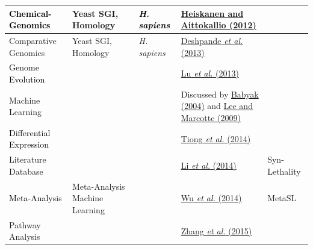\begin{flushleft}
\begin{supertabular}{m{4.421cm}|m{2.342cm}|m{2.388cm}|m{4.552cm}|m{2.299cm}}
\color{black} \textcolor{black}{Chemical-Genomics} &
\color{black} Yeast SGI,
Homology &
\color{black}
\textit{\textcolor{black}{H. sapiens}} &
\color{black}
\hyperlink{ENREF48}{Heiskanen and Aittokallio (2012)} &
~
\\\hline
Comparative Genomics &
Yeast SGI, Homology &
\textit{H. sapiens} &
\hyperlink{ENREF30}{Deshpande}\hyperlink{ENREF30}{\textit{ et
al.}}\hyperlink{ENREF30}{ (2013)} &
~
\\\hline
{}\color{black}
\textcolor{black}{Genome Evolution} &
~
 &
~
 &
\color{black}
\hyperlink{ENREF73}{Lu}\hyperlink{ENREF73}{\textit{\textcolor{black}{
et al.}}}\hyperlink{ENREF73}{ (2013)} &
~
\\\hline
Machine Learning &
~
 &
~
 &
Discussed by \hyperlink{ENREF6}{Babyak (2004)} and
\hyperlink{ENREF64}{Lee and Marcotte (2009)} &
~
\\\hline
{}\color{black}
\textcolor{black}{Differential Expression} &
~
 &
~
 &
\color{black}
\hyperlink{ENREF95}{Tiong}\hyperlink{ENREF95}{\textit{\textcolor{black}{
et al.}}}\hyperlink{ENREF95}{ (2014)} &
~
\\\hline
Literature Database &
~
 &
~
 &
\hyperlink{ENREF69}{Li}\hyperlink{ENREF69}{\textit{ et
al.}}\hyperlink{ENREF69}{ (2014)} &
Syn-Lethality\\\hline
{}\color{black}
\textcolor{black}{Meta-Analysis} &
\color{black}
Meta-Analysis Machine Learning &
~
 &
\color{black}
\hyperlink{ENREF114}{Wu}\hyperlink{ENREF114}{\textit{\textcolor{black}{
et al.}}}\hyperlink{ENREF114}{ (2014)} &
\color{black}
MetaSL\\\hline
Pathway Analysis &
~
 &
~
 &
\hyperlink{ENREF117}{Zhang}\hyperlink{ENREF117}{\textit{ et
al.}}\hyperlink{ENREF117}{ (2015)} &

\end{supertabular}
\end{flushleft}
